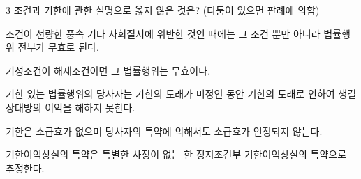 \begin{question}{3}
조건과 기한에 관한 설명으로 옳지 않은 것은? (다툼이 있으면 판례에 의함)
\begin{choices}
  \item 조건이 선량한 풍속 기타 사회질서에 위반한 것인 때에는 그 조건 뿐만 아니라 법률행위 전부가 무효로 된다.
  \item 기성조건이 해제조건이면 그 법률행위는 무효이다.
  \item 기한 있는 법률행위의 당사자는 기한의 도래가 미정인 동안 기한의 도래로 인하여 생길 상대방의 이익을 해하지 못한다.
  \item 기한은 소급효가 없으며 당사자의 특약에 의해서도 소급효가 인정되지 않는다.
  \item 기한이익상실의 특약은 특별한 사정이 없는 한 정지조건부 기한이익상실의 특약으로 추정한다.
\end{choices}
\end{question}
